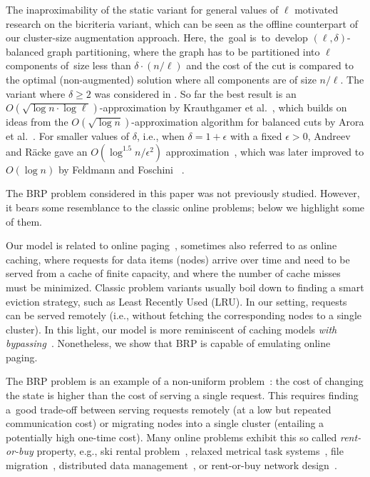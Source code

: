 \documentclass[11pt,a4paper]{scrartcl}
\newcommand{\eps}{\ensuremath{\epsilon}}
\begin{document}
The inaproximability of the static variant for general values of $\ell$
motivated research on the bicriteria variant, which can be seen as the offline
counterpart of our cluster-size augmentation approach. Here, the~goal
is~to~develop $(\ell,\delta)$-balanced graph partitioning, where the graph has
to be partitioned into $\ell$ components of~size less than $\delta \cdot (n /
\ell)$ and the cost of the cut is compared to the optimal (non-augmented)
solution where all components are of size $n / \ell$. The variant where
$\delta \geq 2$ was considered in
\cite{LeMaTr90,SimTen97,EvNaRS00,EvNaRS99,KrNaSc09}. So far the best result is
an $O(\!\sqrt{\log n \cdot \log \ell})$-approximation by Krauthgamer et
al.~\cite{KrNaSc09}, which builds on ideas from the $O(\!\sqrt{\log
n})$-approximation algorithm for balanced cuts by Arora et al.~\cite{ArRaVa09}.
For smaller values of $\delta$, i.e., when $\delta = 1 + \eps$ with a fixed
$\eps > 0$, Andreev and R{\"{a}}cke gave an $O(\log^{1.5} n / \eps^2)$
approximation~\cite{AndRae06}, which was later improved to $O(\log n)$ by
Feldmann and Foschini ~\cite{FelFos15}.

The BRP problem considered in this paper was not previously studied. However,
it bears some resemblance to the classic online problems; below we highlight
some of them.

Our model is related to online
paging~\cite{SleTar85,FKLMSY91,McGSle91,AcChNo00}, sometimes also referred to
as online caching, where requests for data items (nodes) arrive over time and
need to be served from a cache of finite capacity, and where the number of
cache misses must be minimized. Classic problem variants usually boil down to
finding a smart eviction strategy, such as Least Recently Used (LRU). In our
setting, requests can be served remotely (i.e., without fetching the
corresponding nodes to a single cluster). In this light, our model is more
reminiscent of caching models \emph{with
bypassing}~\cite{EpImLN11,EpImLN15,Irani02}. Nonetheless, we show that BRP is
capable of emulating online paging.

The BRP problem is an example of a non-uniform problem~\cite{KaMaMO94}: the
cost of changing the state is higher than the cost of serving a single
request. This requires finding a~good trade-off between serving requests
remotely (at a low but repeated communication cost) or migrating nodes into a
single cluster (entailing a potentially high one-time cost). Many
online problems exhibit this so called \emph{rent-or-buy} property, e.g., ski
rental problem~\cite{KaMaMO94,LoPaRa08}, relaxed metrical task
systems~\cite{BaChIn01}, file migration~\cite{BaChIn01,BiByMu17}, distributed
data management~\cite{BaFiRa95,AwBaFi93,AwBaFi98}, or rent-or-buy network
design~\cite{AwAzBa04,Umboh15,FeWiLe16}.
\end{document}
